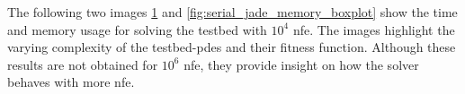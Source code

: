 \documentclass[./\jobname.tex]{subfiles}
\begin{document}
The following two images \ref{fig:serial_jade_time_boxplot} and \ref{fig:serial_jade_memory_boxplot} show the time and memory usage for solving the testbed with $10^4$ \gls{nfe}. The images highlight the varying complexity of the testbed-\gls{pde}s and their fitness function. Although these results are not obtained for $10^6$ \gls{nfe}, they provide insight on how the solver behaves with more \gls{nfe}.  

\begin{figure}[h]
	\centering
	\noindent{}
	\label{fig:serial_jade_time_boxplot}
\end{figure}
\end{document}
